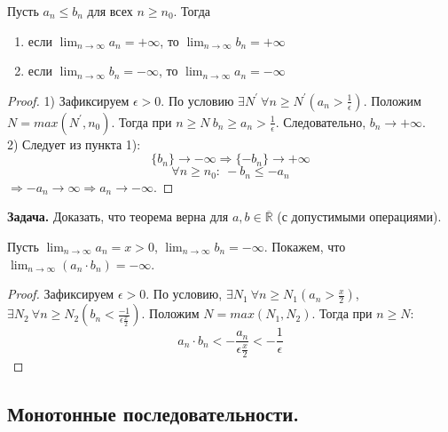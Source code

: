     \begin{theorem}
        Пусть $a_{n} \leq b_{n}$ для всех $n \geq n_{0}$. Тогда 
        \begin{enumerate}
            \item если $\lim_{n \to \infty} a_{n} = + \infty$, то $\lim_{n \to \infty} b_{n} = + \infty$
            \item если $\lim_{n \to \infty} b_{n} = - \infty$, то $\lim_{n \to \infty} a_{n} = - \infty$
        \end{enumerate}
    \end{theorem}
    
    \begin{proof}
        1) Зафиксируем $\epsilon > 0$. По условию $\exists N^{'} \ \forall n \geq N^{'} (a_{n} > \frac{1}{\epsilon})$. Положим $N = max(N^{'}, n_{0})$. Тогда при $n \geq N \  b_{n} \geq a_{n} > \frac{1}{\epsilon}$. Следовательно, $b_{n} \rightarrow + \infty$.
        \\
        2) Следует из пункта 1):
        \[\{b_{n}\} \rightarrow - \infty \Rightarrow \{-b_{n}\} \rightarrow + \infty\]
        \[\forall n \geq n_{0}: \ -b_{n} \leq -a_{n}\]
        $\Rightarrow -a_{n} \rightarrow  \infty \Rightarrow a_{n} \rightarrow - \infty$.
    \end{proof}
    
    \textbf{Задача.} Доказать, что теорема верна для $a,b \in \overline{\mathds{R}}$ (с допустимыми операциями).
    
    \begin{example}
        Пусть $\lim_{n \to \infty} a_{n} = x > 0$, $\lim_{n \to \infty} b_{n} = - \infty$. Покажем, что $\lim_{n \to \infty} (a_{n} \cdot b_{n}) = - \infty$.
    \end{example}
    
    \begin{proof}
        Зафиксируем $\epsilon > 0$. По условию, $\exists N_{1} \  \forall n \geq N_{1} (a_{n} > \frac{x}{2})$, $\exists N_{2} \  \forall n \geq N_{2} (b_{n} < \frac{-1}{\epsilon \frac{x}{2}})$. Положим $N = max(N_{1}, N_{2})$. Тогда при $n \geq N$:
        \[a_{n} \cdot b_{n} < - \frac{a_{n}}{\epsilon \frac{x}{2}} < - \frac{1}{\epsilon}\]
    \end{proof}
    
\subsection{Монотонные последовательности.}

